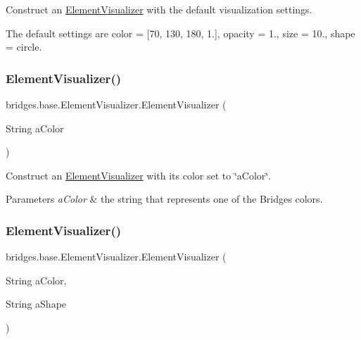Construct an \mbox{\hyperlink{classbridges_1_1base_1_1_element_visualizer}{Element\+Visualizer}} with the default visualization settings.

The default settings are color = \mbox{[}70, 130, 180, 1.\mbox{]}, opacity = 1., size = 10., shape = circle. \mbox{\label{classbridges_1_1base_1_1_element_visualizer_a5c0d9fe8051ebc816372b9836689fdfa}} 
\subsubsection{\texorpdfstring{Element\+Visualizer()}{ElementVisualizer()}\hspace{0.1cm}{\footnotesize\ttfamily [2/6]}}
{\footnotesize\ttfamily bridges.\+base.\+Element\+Visualizer.\+Element\+Visualizer (\begin{DoxyParamCaption}\item[{String}]{a\+Color }\end{DoxyParamCaption})}

Construct an \mbox{\hyperlink{classbridges_1_1base_1_1_element_visualizer}{Element\+Visualizer}} with its color set to \char`\"{}a\+Color\char`\"{}.


\begin{DoxyParams}{Parameters}
{\em a\+Color} & the string that represents one of the Bridges colors. \\
\hline
\end{DoxyParams}
\mbox{\label{classbridges_1_1base_1_1_element_visualizer_ab62b1b06907fbeddfcee2b4b297e1021}} 
\subsubsection{\texorpdfstring{Element\+Visualizer()}{ElementVisualizer()}\hspace{0.1cm}{\footnotesize\ttfamily [3/6]}}
{\footnotesize\ttfamily bridges.\+base.\+Element\+Visualizer.\+Element\+Visualizer (\begin{DoxyParamCaption}\item[{String}]{a\+Color,  }\item[{String}]{a\+Shape }\end{DoxyParamCaption})}


